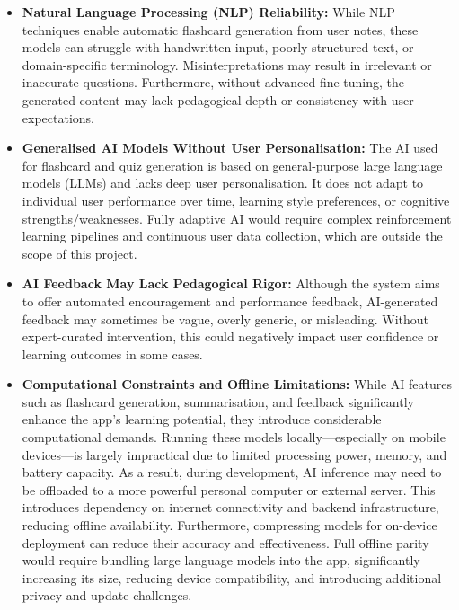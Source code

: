 \documentclass[a4paper,12pt]{article}
\begin{document}
\begin{itemize}
    \item \textbf{Natural Language Processing (NLP) Reliability:} While NLP techniques enable automatic flashcard generation from user notes, these models can struggle with handwritten input, poorly structured text, or domain-specific terminology. Misinterpretations may result in irrelevant or inaccurate questions. Furthermore, without advanced fine-tuning, the generated content may lack pedagogical depth or consistency with user expectations.
    
    \item \textbf{Generalised AI Models Without User Personalisation:} The AI used for flashcard and quiz generation is based on general-purpose large language models (LLMs) and lacks deep user personalisation. It does not adapt to individual user performance over time, learning style preferences, or cognitive strengths/weaknesses. Fully adaptive AI would require complex reinforcement learning pipelines and continuous user data collection, which are outside the scope of this project.
    
    \item \textbf{AI Feedback May Lack Pedagogical Rigor:} Although the system aims to offer automated encouragement and performance feedback, AI-generated feedback may sometimes be vague, overly generic, or misleading. Without expert-curated intervention, this could negatively impact user confidence or learning outcomes in some cases.
    
    \item \textbf{Computational Constraints and Offline Limitations:} While AI features such as flashcard generation, summarisation, and feedback significantly enhance the app’s learning potential, they introduce considerable computational demands. Running these models locally---especially on mobile devices---is largely impractical due to limited processing power, memory, and battery capacity. As a result, during development, AI inference may need to be offloaded to a more powerful personal computer or external server. This introduces dependency on internet connectivity and backend infrastructure, reducing offline availability. Furthermore, compressing models for on-device deployment can reduce their accuracy and effectiveness. Full offline parity would require bundling large language models into the app, significantly increasing its size, reducing device compatibility, and introducing additional privacy and update challenges.
    

\end{itemize}
\end{document}
